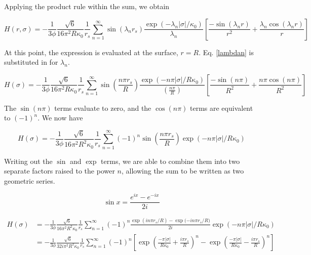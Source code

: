 \documentclass[onecolumn]{aastex63}
\begin{document}
Applying the product rule within the sum, we obtain

\begin{equation}
    H(r, \sigma) = - \frac{1}{3 \phi} \frac{\sqrt{6}}{16 \pi^2 R \kappa_0} \frac{1}{r_s} \sum_{n=1}^{\infty} \sin(\lambda_n r_s) \frac{\exp{(-\lambda_n |\sigma|/\kappa_0)}}{\lambda_n} \left[ \frac{-\sin(\lambda_n r)}{r^2} + \frac{\lambda_n \cos(\lambda_n r)}{r}\right]
\end{equation}

At this point, the expression is evaluated at the surface, $r=R$. Eq. \ref{lambdan} is substituted in for $\lambda_n$.

\begin{equation}
    H(\sigma) = - \frac{1}{3 \phi} \frac{\sqrt{6}}{16 \pi^2 R \kappa_0} \frac{1}{r_s} \sum_{n=1}^{\infty} \sin{\left(\frac{n\pi r_s}{R}\right)} \frac{\exp{(-n \pi |\sigma|/R\kappa_0)}}{\left(\frac{n\pi}{R}\right)} \left[ \frac{-\sin(n \pi)}{R^2} + \frac{n \pi \cos(n \pi)}{R^2}\right]
\end{equation}

The $\sin(n\pi)$ terms evaluate to zero, and the $\cos(n\pi)$ terms are equivalent to $(-1)^n$. We now have

\begin{equation}
    H(\sigma) = - \frac{1}{3 \phi} \frac{\sqrt{6}}{16 \pi^2 R^2 \kappa_0} \frac{1}{r_s} \sum_{n=1}^{\infty} (-1)^n \sin{\left(\frac{n\pi r_s}{R}\right)} \exp{(-n \pi |\sigma|/R\kappa_0)}
\end{equation}

Writing out the $\sin$ and $\exp$ terms, we are able to combine them into two separate factors raised to the power $n$, allowing the sum to be written as two geometric series.

\begin{equation}
    \sin{x} = \frac{e^{ix}-e^{-ix}}{2i}
\end{equation}

\begin{equation}
    \begin{split}
        H(\sigma) &= - \frac{1}{3 \phi} \frac{\sqrt{6}}{16 \pi^2 R^2 \kappa_0} \frac{1}{r_s} \sum_{n=1}^{\infty} (-1)^n \frac{\exp{(in\pi r_s / R)}-\exp{(-in\pi r_s/R})}{2i} \exp{(-n \pi |\sigma|/R\kappa_0)} \\
        &= - \frac{1}{3 \phi} \frac{\sqrt{6}}{32 i \pi^2 R^2 \kappa_0} \frac{1}{r_s} \sum_{n=1}^{\infty} (-1)^n \left[ \exp{\left(\frac{-\pi |\sigma|}{R\kappa_0} + \frac{i\pi r_s}{R}\right)^n}-\exp{\left(\frac{-\pi |\sigma|}{R\kappa_0} - \frac{i\pi r_s}{R}\right)^n}\right]
    \end{split}
\end{equation}
\end{document}
